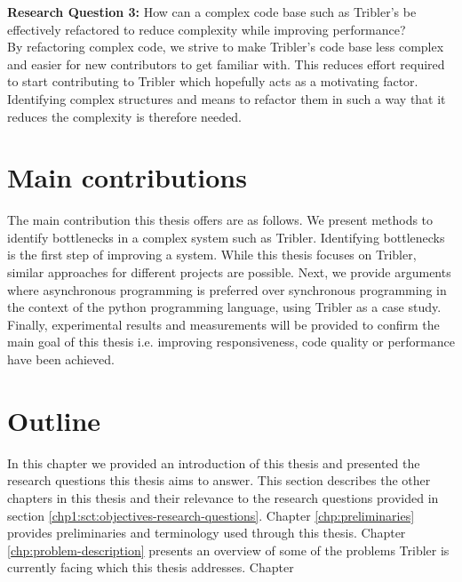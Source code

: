 \noindent
\textbf{Research Question 3:} How can a complex code base such as Tribler's be effectively refactored to reduce complexity while improving performance?\\

By refactoring complex code, we strive to make Tribler's code base less complex and easier for new contributors to get familiar with.
This reduces effort required to start contributing to Tribler which hopefully acts as a motivating factor.
Identifying complex structures and means to refactor them in such a way that it reduces the complexity is therefore needed.

\section{Main contributions}
The main contribution this thesis offers are as follows. We present methods to identify bottlenecks in a complex system such as Tribler. 
Identifying bottlenecks is the first step of improving a system. While this thesis focuses on Tribler, similar approaches for different projects are possible.
Next, we provide arguments where asynchronous programming is preferred over synchronous programming in the context of the python programming language, using Tribler as a case study.
Finally, experimental results and measurements will be provided to confirm the main goal of this thesis i.e. improving responsiveness, code quality or performance have been achieved.

\section{Outline}
In this chapter we provided an introduction of this thesis and presented the research questions this thesis aims to answer. 
This section describes the other chapters in this thesis and their relevance to the research questions provided in section \ref{chp1:sct:objectives-research-questions}.
Chapter \ref{chp:preliminaries} provides preliminaries and terminology used through this thesis.
Chapter \ref{chp:problem-description} presents an overview of some of the problems Tribler is currently facing which this thesis addresses.
Chapter 
